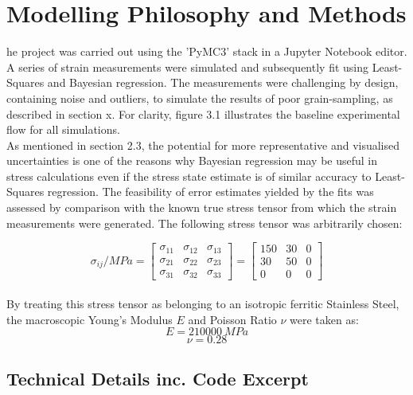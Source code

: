 %
%
\let\textcircled=\pgftextcircled
\chapter{Modelling Philosophy and Methods}
\label{chap:intro}

he project was carried out using the 'PyMC3' stack in a Jupyter Notebook editor. A series of strain measurements were simulated and subsequently fit using Least-Squares and Bayesian regression. The measurements were challenging by design, containing noise and outliers, to simulate the results of poor grain-sampling, as described in section x. For clarity, figure 3.1 illustrates the baseline experimental flow for all simulations. \\

As mentioned in section 2.3, the potential for more representative and visualised uncertainties is one of the reasons why Bayesian regression may be useful in stress calculations even if the stress state estimate is of similar accuracy to Least-Squares regression. The feasibility of error estimates yielded by the fits was assessed by comparison with the known true stress tensor from which the strain measurements were generated. The following stress tensor was arbitrarily chosen: 

$$   \sigma_{ij} / MPa  =\begin{bmatrix} \sigma_{11} & \sigma_{12} & \sigma_{13} \\ \sigma_{21} & \sigma_{22} & \sigma_{23} \\ \sigma_{31} & \sigma_{32} & \sigma_{33} \end{bmatrix}   =\begin{bmatrix} 150 & 30 & 0 \\ 30 & 50 & 0 \\ 0 & 0 & 0 \end{bmatrix}$$\\

By treating this stress tensor as belonging to an isotropic ferritic Stainless Steel, the macroscopic Young's Modulus $E$ and Poisson Ratio $\nu$ were taken as: \cite{cambridgeuniversityengineeringdepartment_2003_materials}
$$E = 210000 \ MPa $$
$$\nu = 0.28 $$

\section{Technical Details inc. Code Excerpt}
\label{sec:sec01}

